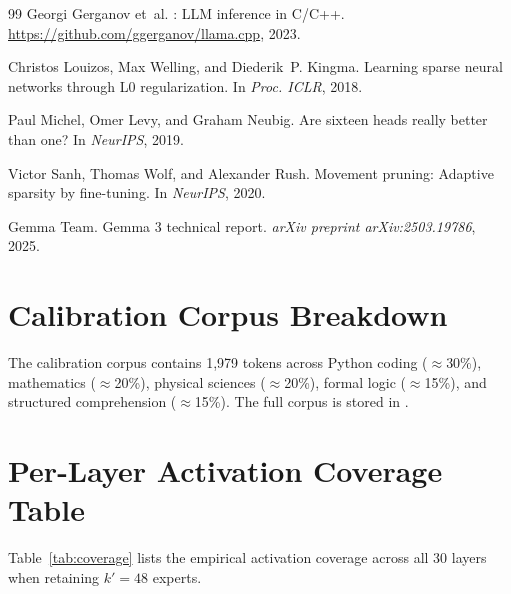 \documentclass[final]{article}
\begin{document}
\begin{thebibliography}{99}
Georgi Gerganov et~al.
: {LLM} inference in {C/C++}.
\newblock \url{https://github.com/ggerganov/llama.cpp}, 2023.

Christos Louizos, Max Welling, and Diederik~P. Kingma.
\newblock Learning sparse neural networks through {L0} regularization.
\newblock In \emph{Proc. ICLR}, 2018.

Paul Michel, Omer Levy, and Graham Neubig.
\newblock Are sixteen heads really better than one?
\newblock In \emph{NeurIPS}, 2019.

Victor Sanh, Thomas Wolf, and Alexander Rush.
\newblock Movement pruning: Adaptive sparsity by fine-tuning.
\newblock In \emph{NeurIPS}, 2020.

{Gemma Team}.
\newblock Gemma 3 technical report.
\newblock \emph{arXiv preprint arXiv:2503.19786}, 2025.

\end{thebibliography}

\appendix

\section{Calibration Corpus Breakdown}
\label{app:corpus}

The calibration corpus contains 1,979 tokens across Python coding ($\approx$30\%), mathematics ($\approx$20\%), physical sciences ($\approx$20\%), formal logic ($\approx$15\%), and structured comprehension ($\approx$15\%). The full corpus is stored in .

\section{Per-Layer Activation Coverage Table}
\label{app:coverage}

Table~\ref{tab:coverage} lists the empirical activation coverage across all 30 layers when retaining $k'=48$ experts.
\end{document}
